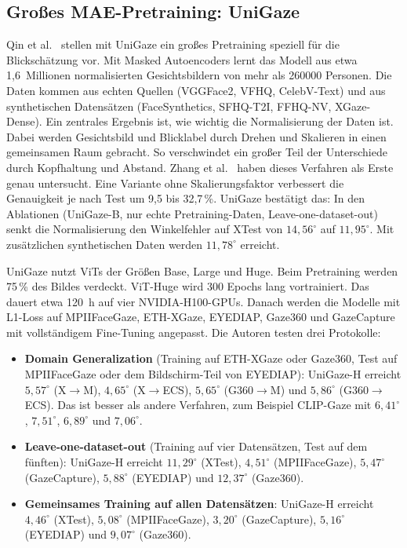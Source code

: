 \subsection{Großes MAE-Pretraining: UniGaze}
\label{subsec:unigaze}
Qin et al.~\cite{qin2026unigaze} stellen mit UniGaze ein großes Pretraining
speziell für die Blickschätzung vor. Mit Masked Autoencoders lernt das Modell
aus etwa 1,6~Millionen normalisierten Gesichtsbildern von mehr als
\num{260000} Personen. Die Daten kommen aus echten Quellen (VGGFace2, VFHQ,
CelebV-Text) und aus synthetischen Datensätzen (FaceSynthetics, SFHQ-T2I,
FFHQ-NV, XGaze-Dense). Ein zentrales Ergebnis ist, wie wichtig die
Normalisierung der Daten ist. Dabei werden Gesichtsbild und Blicklabel durch
Drehen und Skalieren in einen gemeinsamen Raum gebracht. So verschwindet ein
großer Teil der Unterschiede durch Kopfhaltung und Abstand. Zhang et
al.~\cite{zhang2018normalization} haben dieses Verfahren als Erste genau
untersucht. Eine Variante ohne Skalierungsfaktor verbessert die Genauigkeit je
nach Test um 9,5 bis 32,7\,\%. UniGaze bestätigt das: In den Ablationen
(UniGaze-B, nur echte Pretraining-Daten, Leave-one-dataset-out) senkt die
Normalisierung den Winkelfehler auf XTest von $14,56^\circ$ auf $11,95^\circ$.
Mit zusätzlichen synthetischen Daten werden $11,78^\circ$ erreicht.

UniGaze nutzt ViTs der Größen Base, Large und Huge. Beim Pretraining werden
75\,\% des Bildes verdeckt. ViT-Huge wird 300 Epochs lang vortrainiert. Das
dauert etwa \SI{120}{\hour} auf vier NVIDIA-H100-GPUs. Danach werden die
Modelle mit L1-Loss auf MPIIFaceGaze, ETH-XGaze, EYEDIAP, Gaze360 und
GazeCapture mit vollständigem Fine-Tuning angepasst. Die Autoren testen drei Protokolle:
\begin{itemize}
  \item \textbf{Domain Generalization} (Training auf ETH-XGaze oder Gaze360,
        Test auf MPIIFaceGaze oder dem Bildschirm-Teil von EYEDIAP):
        UniGaze-H erreicht $5,57^\circ$ (X$\rightarrow$M), $4,65^\circ$
        (X$\rightarrow$ECS), $5,65^\circ$ (G360$\rightarrow$M) und $5,86^\circ$
        (G360$\rightarrow$ECS). Das ist besser als andere Verfahren, zum
        Beispiel CLIP-Gaze mit $6,41^\circ$, $7,51^\circ$, $6,89^\circ$ und
        $7,06^\circ$.
  \item \textbf{Leave-one-dataset-out} (Training auf vier Datensätzen, Test
        auf dem fünften): UniGaze-H erreicht $11,29^\circ$ (XTest),
        $4,51^\circ$ (MPIIFaceGaze), $5,47^\circ$ (GazeCapture), $5,88^\circ$
        (EYEDIAP) und $12,37^\circ$ (Gaze360).
  \item \textbf{Gemeinsames Training auf allen Datensätzen}: UniGaze-H
        erreicht $4,46^\circ$ (XTest), $5,08^\circ$ (MPIIFaceGaze),
        $3,20^\circ$ (GazeCapture), $5,16^\circ$ (EYEDIAP) und $9,07^\circ$
        (Gaze360).
\end{itemize}

